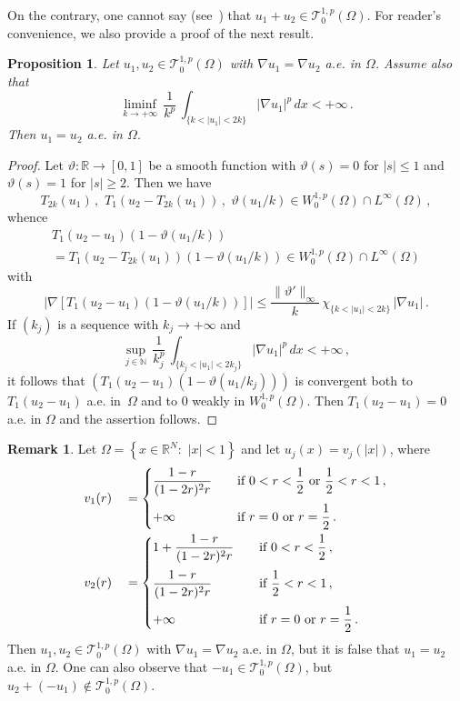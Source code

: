 \documentclass[twoside,reqno]{amsart}
\numberwithin{equation}{section}
\newtheorem{prop}[thm]{Proposition}
\theoremstyle{definition}
\newtheorem{rem}[thm]{Remark}
\newcommand{\N}{\mathbb{N}}
\newcommand{\R}{\mathbb{R}}
\begin{document}
On the contrary, one cannot say 
(see~\cite{benilan_boccardo_gallouet_gariepy_pierre_vazquez1995})
that $u_1 + u_2 \in \mathcal{T}^{1,p}_0(\Omega)$.
For reader's convenience, we also provide a proof 
of the next result.
%
\begin{prop}
\label{prop:nabla}
Let $u_1, u_2 \in \mathcal{T}^{1,p}_0(\Omega)$
with $\nabla u_1 = \nabla u_2$ a.e. in $\Omega$.
Assume also that
\[
\liminf_{k\to+\infty} \, \frac{1}{k^p}\,
\int_{\{k<|u_1|<2k\}} |\nabla u_1|^p\,dx 
< +\infty\,.
\]
\indent
Then $u_1 = u_2$ a.e. in $\Omega$.
\end{prop}
%
\begin{proof}
Let $\vartheta:\R\rightarrow[0,1]$ be a smooth function
with $\vartheta(s)=0$ for $|s|\leq 1$ and 
$\vartheta(s)=1$ for $|s|\geq 2$.
Then we have 
\[
T_{2k}(u_1) \,,\,\,T_1(u_2-T_{2k}(u_1)) \,,\,\,
\vartheta(u_1/k)
\in W^{1,p}_0(\Omega)\cap L^\infty(\Omega)\,,
\]
whence
\begin{multline*}
T_1(u_2-u_1)(1-\vartheta(u_1/k)) \\
= T_1(u_2-T_{2k}(u_1))(1-\vartheta(u_1/k)) \in 
W^{1,p}_0(\Omega)\cap L^\infty(\Omega)
\end{multline*}
with
\[
|\nabla[T_1(u_2-u_1)(1-\vartheta(u_1/k))]| \leq
\frac{\|\vartheta'\|_\infty}{k}\,\chi_{\{k<|u_1|<2k\}}\,
|\nabla u_1| \,.
\]
If $(k_j)$ is a sequence with $k_j\to+\infty$ and
\[
\sup_{j\in\N} \, \frac{1}{k_j^p}\,
\int_{\{k_j<|u_1|<2k_j\}} |\nabla u_1|^p\,dx 
< +\infty\,,
\]
it follows that
$(T_1(u_2-u_1)(1-\vartheta(u_1/k_j)))$ is convergent both to
$T_1(u_2-u_1)$ a.e. in~$\Omega$ and to $0$ weakly in 
$W^{1,p}_0(\Omega)$.
Then $T_1(u_2-u_1)=0$ a.e. in $\Omega$ and the assertion follows.
\end{proof}
%
\begin{rem}
Let $\Omega=\left\{x\in\R^N:\,\,|x|<1\right\}$ and
let $u_j(x)=v_j(|x|)$, where
\begin{alignat*}{3}
&v_1(r) &&=
\begin{cases}
\dfrac{1-r}{(1-2r)^2r}
&\quad\text{if $0<r<\dfrac{1}{2}$ or $\dfrac{1}{2}<r<1$}\,,\\
\noalign{\medskip}
+\infty
&\quad\text{if $r=0$ or $r=\dfrac{1}{2}$}\,.
\end{cases}
\\
&v_2(r) &&=
\begin{cases}
1 + \dfrac{1-r}{(1-2r)^2r}
&\quad\text{if $0<r<\dfrac{1}{2}$}\,,\\
\noalign{\medskip}
\dfrac{1-r}{(1-2r)^2r}
&\quad\text{if $\dfrac{1}{2}<r<1$}\,,\\
\noalign{\medskip}
+\infty
&\quad\text{if $r=0$ or $r=\dfrac{1}{2}$}\,.
\end{cases}
\end{alignat*}
Then $u_1, u_2 \in \mathcal{T}^{1,p}_0(\Omega)$
with $\nabla u_1 = \nabla u_2$ a.e. in $\Omega$,
but it is false that $u_1 = u_2$ a.e. in $\Omega$.
One can also observe that $-u_1\in \mathcal{T}^{1,p}_0(\Omega)$,
but $u_2+(-u_1)\not\in \mathcal{T}^{1,p}_0(\Omega)$.
\end{rem}
\end{document}
